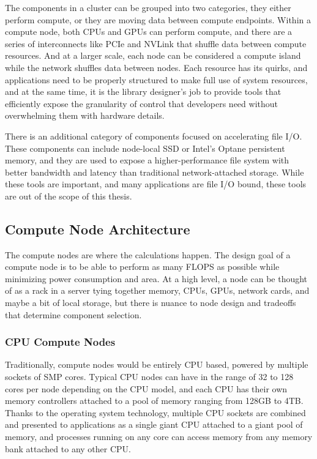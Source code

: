 The components in a cluster can be grouped into two categories, they either perform compute, or they are moving data between compute endpoints.
Within a compute node, both CPUs and GPUs can perform compute, and there are a series of interconnects like PCIe and NVLink that shuffle data between compute resources.
And at a larger scale, each node can be considered a compute island while the network shuffles data between nodes.
Each resource has its quirks, and applications need to be properly structured to make full use of system resources, and at the same time, it is the library designer's job to provide tools that efficiently expose the granularity of control that developers need without overwhelming them with hardware details.

There is an additional category of components focused on accelerating file I/O.
These components can include node-local SSD or Intel's Optane persistent memory, and they are used to expose a higher-performance file system with better bandwidth and latency than traditional network-attached storage.
While these tools are important, and many applications are file I/O bound, these tools are out of the scope of this thesis. 

\subsection{Compute Node Architecture}
The compute nodes are where the calculations happen.
The design goal of a compute node is to be able to perform as many FLOPS as possible while minimizing power consumption and area.
At a high level, a node can be thought of as a rack in a server tying together memory, CPUs, GPUs, network cards, and maybe a bit of local storage, but there is nuance to node design and tradeoffs that determine component selection. 

\subsubsection{CPU Compute Nodes}
Traditionally, compute nodes would be entirely CPU based, powered by multiple sockets of SMP cores.
Typical CPU nodes can have in the range of 32 to 128 cores per node depending on the CPU model, and each CPU has their own memory controllers attached to a pool of memory ranging from 128GB to 4TB.
Thanks to the operating system technology, multiple CPU sockets are combined and presented to applications as a single giant CPU attached to a giant pool of memory, and processes running on any core can access memory from any memory bank attached to any other CPU.

